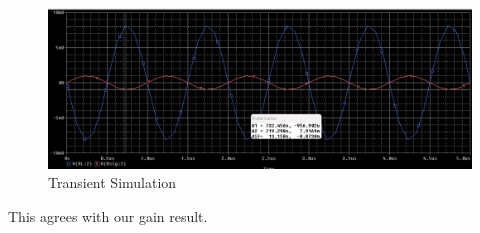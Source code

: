 \begin{enumerate}
\begin{enumerate}
        \begin{figure}[H]
          \centering
          \includegraphics[width=.8\textwidth]{Figures/HW11-4d}
          \caption{Transient Simulation}
          \label{fig:6}
        \end{figure}

        This agrees with our gain result.

    \end{enumerate}

\end{enumerate}



